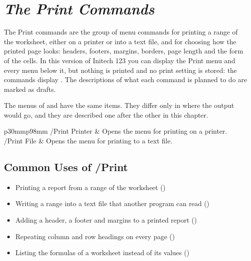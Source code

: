 
\chapter[The Print Commands]{\textit{The Print Commands}}


The Print commands are the group of menu commands for printing a range of the worksheet, either on a printer or into a text file, and for choosing how the printed page looks: headers, footers, margins, borders, page length and the form of the cells.  In this version of Initech 123 you can display the Print menu and every menu below it, but nothing is printed and no print setting is stored: the commands display .  The descriptions of what each command is planned to do are marked as drafts.

The menus of  and  have the same items.  They differ only in where the output would go, and they are described one after the other in this chapter.

\begin{LotTable}{p{30mm}p{98mm}}
/Print Printer & Opens the menu for printing on a printer. \\
/Print File & Opens the menu for printing to a text file.\LotEnd
\end{LotTable}

\section{Common Uses of /Print}
\begin{itemize}
\item Printing a report from a range of the worksheet () 
\item Writing a range into a text file that another program can read () 
\item Adding a header, a footer and margins to a printed report () 
\item Repeating column and row headings on every page () 
\item Listing the formulas of a worksheet instead of its values () 
\end{itemize}


